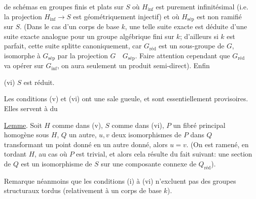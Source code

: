  de schémas en groupes finis et plats sur $S$
où $H_{\mathrm{inf}}$ est purement infinitésimal (i.e. la projection $H_{\mathrm{inf}}\to S$ est géométriquement injectif) et où $H_{\text{sép}}$ est non ramifié sur $S$. (Dans le cas d'un corps de base $k$, une telle suite exacte est déduite d'une suite exacte analogue pour un groupe algébrique fini  sur $k$; d'ailleurs si $k$ est parfait, cette suite splitte canoniquement, car $G_{\text{réd}}$ est  un sous-groupe de $G$, isomorphe à $G_{\text{sép}}$ par la projection $G\quad G_{\text{sép}}$. Faire attention cependant que $G_{\text{réd}}$ va opérer sur $G_{\mathrm{inf}}$, on aura seulement un produit semi-direct). Enfin


(vi) $S$ est réduit.

Les conditions (v) et (vi) ont une sale gueule, et sont essentiellement provisoires. Elles servent à   du

\uline{Lemme}. Soit $H$ comme dans (v), $S$ comme dans (vi), $P$ un fibré principal homogène sous $H$, $Q$ un autre, $u,v$ deux isomorphismes de $P$ dans $Q$ transformant un point   donné en un autre donné, alors $u=v$. (On est ramené, en tordant $H$, au cas où $P$ est trivial, et alors cela résulte du fait suivant: une section de $Q$ est un isomorphisme de $S$ sur une composante connexe de $Q_{\text{réd}}$).

Remarque néanmoins que les conditions (i) à (vi) n'excluent pas des groupes structuraux tordus (relativement à un corps de base $k$).

